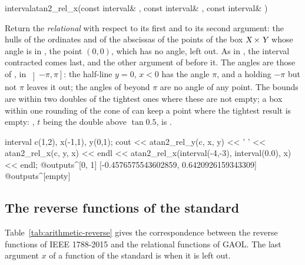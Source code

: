 \begin{deffun}{interval}{atan2\_rel\_x}{(const interval\& , const interval\& , const interval\& )}
  \begin{operation}
  \end{operation}
  Return the \emph{relational}  with respect to its first and to
  its second argument: the hulls of the ordinates and of the abscissas of
  the points of the box $\textsl{X}\times\textsl{Y}$ whose angle is in ,
  the point $(0,0)$, which has no angle, left out.\newinvfive{} As in
  , the interval contracted comes last, and the other
  argument of  before it. The angles are those of ,
  in $\left]-\pi,\pi\right]$: the half-line $y=0$, $x<0$ has the angle
  $\pi$, and a  holding $-\pi$ but not $\pi$ leaves it out; the
  angles of  beyond $\pi$ are no angle of any point. The bounds are
  within two doubles of the tightest ones where these are not empty; a box
  within one rounding of the cone of  can keep a point where the
  tightest result is empty: , $t$ being the double above $\tan 0.5$, is .
\begin{example}
interval c(1,2), x(-1,1), y(0,1);
cout << atan2_rel_y(c, x, y) << ' '
     << atan2_rel_x(c, y, x) << endl
     << atan2_rel_x(interval(-4,-3), interval(0.0), x)
     << endl;
@outputs^[0, 1] [-0.4576575543602859, 0.6420926159343309]~
@outputs^[empty]~
\end{example}
\end{deffun}

\subsection{The reverse functions of the standard}
\label{sec:arithmetic-reverse-names}

Table~\ref{tab:arithmetic-reverse} gives the correspondence between the
reverse functions of IEEE 1788-2015 and the relational functions of GAOL.
The last argument $x$ of a function of the standard is
\itv{-\infty}{+\infty} when it is left out.

